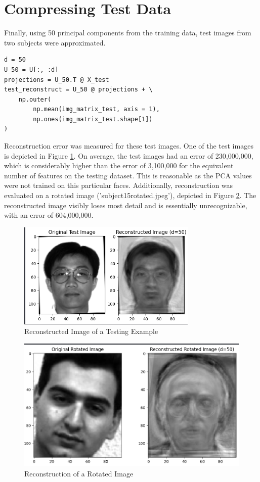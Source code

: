 \documentclass[conference]{IEEEtran}
\begin{document}
\section{Compressing Test Data}
Finally, using 50 principal components from the training data, test images from two subjects were approximated.
\begin{verbatim}
d = 50
U_50 = U[:, :d]
projections = U_50.T @ X_test
test_reconstruct = U_50 @ projections + \
    np.outer(
        np.mean(img_matrix_test, axis = 1),
        np.ones(img_matrix_test.shape[1])
)
\end{verbatim}

Reconstruction error was measured for these test images. One of the test images is depicted in Figure \ref{fig:reconstructed_test}. On average, the test images had an error of 230,000,000, which is considerably higher than the error of 3,100,000 for the equivalent number of features on the testing dataset. This is reasonable as the PCA values were not trained on this particular faces. Additionally, reconstruction was evaluated on a rotated image ('subject15rotated.jpeg'), depicted in Figure \ref{fig:reconstructed_rotated}. The reconstructed image visibly loses most detail and is essentially unrecognizable, with an error of 604,000,000.

\begin{figure}[htbp]
  \centerline{\includegraphics[scale=0.4]{figures/reconstructed_test.png}}
  \caption{Reconstructed Image of a Testing Example}
  \label{fig:reconstructed_test}
\end{figure}  

\begin{figure}[htbp]
  \centerline{\includegraphics[scale=0.4]{figures/reconstructed_rotated.png}}
  \caption{Reconstruction of a Rotated Image}
  \label{fig:reconstructed_rotated}
\end{figure}  
\end{document}
